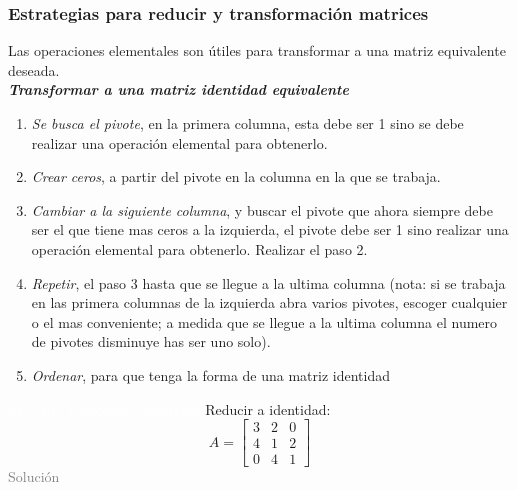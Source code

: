 \subsubsection{Estrategias para reducir y transformación matrices}
Las operaciones elementales son útiles para transformar a una matriz equivalente deseada. \\
\textbf{\textit{Transformar a una matriz identidad equivalente}}
\begin{enumerate}
	\item \textit{Se busca el pivote}, en la primera columna, esta debe ser 1 sino se debe realizar una operación elemental para obtenerlo.
	\item \textit{Crear ceros}, a partir del pivote en la columna en la que se trabaja.
	\item \textit{Cambiar a la siguiente columna}, y buscar el pivote que ahora siempre debe ser el que tiene mas ceros a la izquierda, el pivote debe ser 1 sino realizar una operación elemental para obtenerlo. Realizar el paso 2.
	\item \textit{Repetir}, el paso 3 hasta que se llegue a la ultima columna (nota: si se trabaja en las primera columnas de la izquierda abra varios pivotes, escoger cualquier o el mas conveniente; a medida que se llegue a la ultima columna el numero de pivotes disminuye has ser uno solo).
	\item \textit{Ordenar}, para que tenga la forma de una matriz identidad
\end{enumerate}
\addtocounter{exr}{1} 
\colorbox{gray!55}{\textcolor{white}{Ej.) O.E. reducción a identidad}}
	Reducir a identidad:
	$$
	A=\begin{bmatrix}
		3 & 2 & 0 \\
		4 & 1 & 2 \\
		0 & 4 & 1
	\end{bmatrix}
	$$
\textcolor{gray}{Solución }
